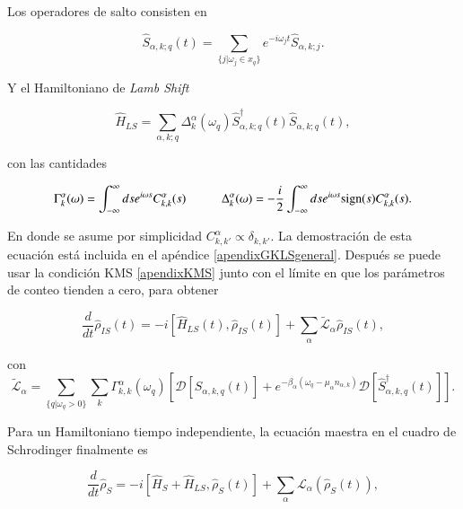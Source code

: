 Los operadores de salto consisten en

\begin{equation*}
    \hat{S}_{\alpha,k;q}(t) = \sum_{\{j|\omega_{j}\in x_{q} \} } e^{-i\omega_{j}t}\hat{S}_{\alpha,k;j}.
\end{equation*}

Y el Hamiltoniano de \textit{Lamb Shift}

\begin{equation*}
    \hat{H}_{LS} = \sum_{\alpha,k;q} \Delta^{\alpha}_{k}(\omega_{q}) \hat{S}^{\dagger}_{\alpha,k;q}(t)\hat{S}_{\alpha,k;q}(t),
\end{equation*}

con las cantidades

\begin{equation*}
    \Gamma_{k}^{\alpha}(\omega) = \int_{-\infty}^{\infty}ds e^{i\omega s}C^{\alpha}_{k,k}(s) \hspace{10mm} \Delta^{\alpha}_{k}(\omega) = - \frac{i}{2} \int^{\infty}_{-\infty}ds e^{i\omega s} \text{sign}(s)C^{\alpha}_{k,k}(s).
\end{equation*}

En donde se asume por simplicidad $C^{\alpha}_{k,k'} \propto \delta_{k,k'}$. La demostración de esta ecuación está incluida en el apéndice \ref{apendixGKLSgeneral}. Después se puede usar la condición KMS \ref{apendixKMS} junto con el límite en que  los parámetros de conteo tienden a cero, para obtener

\begin{equation*}
    \frac{d}{dt}\hat{\rho}_{IS}(t) = - i[\hat{H}_{LS}(t),\hat{\rho}_{IS}(t)] + \sum_{\alpha}\tilde{\mathcal{L}}_{\alpha} \hat{\rho}_{IS}(t),
\end{equation*}

con
\begin{equation*}
    \tilde{\mathcal{L}}_{\alpha} = \sum_{\{q|\omega_{q}>0\}} \sum_{k}\Gamma^{\alpha}_{k,k}(\omega_{q}) \left[ \mathcal{D}[\hat{S}_{\alpha,k,q}(t)] + e^{-\beta_{\alpha}(\omega_{q} - \mu_{\alpha}n_{\alpha,k})}\mathcal{D}[\hat{S}^{\dagger}_{\alpha,k,q}(t)]  \right].
\end{equation*}

Para un Hamiltoniano tiempo independiente, la ecuación maestra en el cuadro de Schrodinger finalmente es

\begin{equation}
    \frac{d}{dt}\hat{\rho}_{S} = -i [\hat{H}_{S}+ \hat{H}_{LS},\hat{\rho}_{S}(t)] + \sum_{\alpha}\mathcal{L}_{\alpha}(\hat{\rho}_{S}(t)),
\label{sec2schrodingerthermo}
\end{equation}


